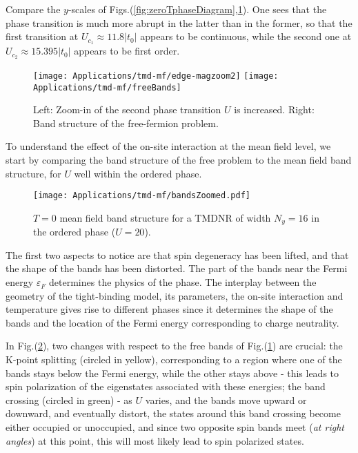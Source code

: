 Compare the $y$-scales of Figs.(\ref{fig:zeroTphaseDiagram},\ref{fig:freeBands}).
One sees that the phase transition is much more abrupt in the latter than in the former, so that the first transition at $U_{c_1} \approx 11.8 |t_0|$ appears to be continuous, while the second one at $U_{c_2} \approx 15.395 |t_0|$ appears to be first order.
\begin{figure}[H]
\hspace{0.3cm}
\texttt{[image: Applications/tmd-mf/edge-magzoom2]}
\hspace{0.5cm}
\texttt{[image: Applications/tmd-mf/freeBands]}
	\caption[Zoom-in of the second phase transition (as $U$ is increased). Band structure of the free-fermion problem.]{Left: Zoom-in of the second phase transition $U$ is increased. Right: Band structure of the free-fermion problem.
	\label{fig:freeBands}}
\end{figure}
To understand the effect of the on-site interaction at the mean field level, we start by comparing the band structure of the free problem to the mean field band structure, for $U$ well within the ordered phase.
\begin{figure}[H]
\centering
\texttt{[image: Applications/tmd-mf/bandsZoomed.pdf]}
	\caption[$T=0$ mean field band structure for a \ac{TMDNR} of width $N_y = 16$ in the ordered phase, at $U=20$.]{$T=0$ mean field band structure for a \ac{TMDNR} of width $N_y = 16$ in the ordered phase ($U=20$).}
	\label{fig:bandsZoomed}
\end{figure}

The first two aspects to notice are that spin degeneracy has been lifted, and that the shape of the bands has been distorted.
The part of the bands near the Fermi energy $\varepsilon_F$ determines the physics of the phase.
The interplay between the geometry of the tight-binding model, its parameters, the on-site interaction and temperature gives rise to different phases since it determines the shape of the bands and the location of the Fermi energy corresponding to charge neutrality.

In Fig.(\ref{fig:bandsZoomed}), two changes with respect to the free bands of Fig.(\ref{fig:freeBands}) are crucial:
the K-point splitting (circled in yellow), corresponding to a region where one of the bands stays below the Fermi energy, while the other stays above - this leads to spin polarization of the eigenstates associated with these energies; the band crossing (circled in green) - as $U$ varies, and the bands move upward or downward, and eventually distort, the states around this band crossing become either occupied or unoccupied, and since two opposite spin bands meet (\emph{at right angles}) at this point, this will most likely lead to spin polarized states.

